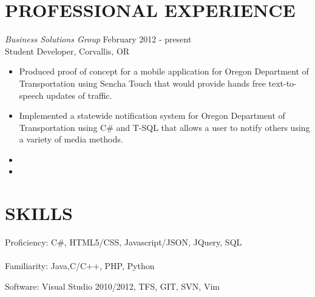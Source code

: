 \documentclass{res}
\begin{document}
\begin{resume}
\vspace{0.2in}
\section{PROFESSIONAL EXPERIENCE}
\vspace{8pt}
{\sl Business Solutions Group} \hfill        February 2012 - present \\
Student Developer, Corvallis, OR

   \begin{itemize} \itemsep -2pt %
   \item Produced proof of concept for a mobile application for Oregon Department of Transportation using Sencha Touch that would provide hands free text-to-speech updates of traffic.
   \item Implemented a statewide notification system for Oregon Department of Transportation using C\# and T-SQL that allows a user to notify others using a variety of media methods.
   \item
   \item
 \end{itemize}
\vspace{0.2in}
\section{SKILLS}
\vspace{8pt}
Proficiency: C\#, HTML5/CSS, Javascript/JSON, JQuery, SQL
\\
\\
Familiarity: Java,C/C++, PHP, Python

Software: Visual Studio 2010/2012, TFS, GIT, SVN, Vim

\end{resume}
\end{document}
